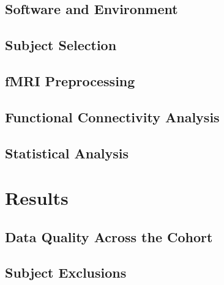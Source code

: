 \documentclass[11pt, a4paper]{article}
\begin{document}
%

\subsection{Software and Environment}

\subsection{Subject Selection}

\subsection{fMRI Preprocessing}

\subsection{Functional Connectivity Analysis}

\subsection{Statistical Analysis}

\section{Results}
\label{sec:results}

%

\subsection{Data Quality Across the Cohort}

\subsection{Subject Exclusions}
\end{document}
